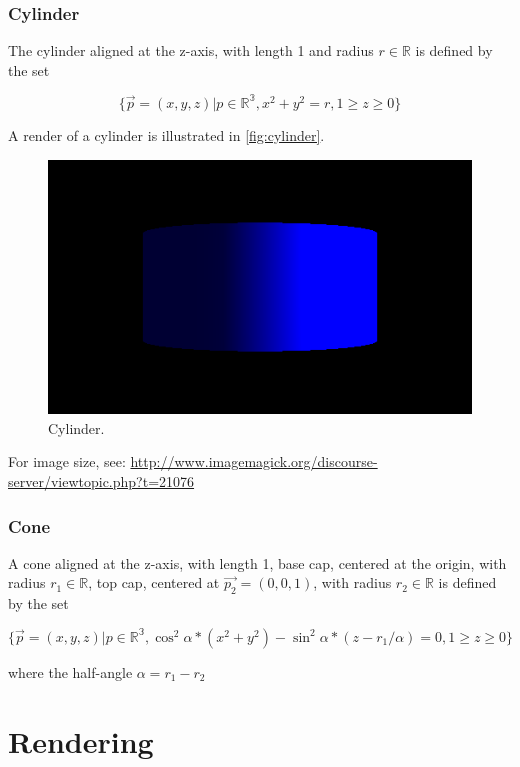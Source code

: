 \subsubsection{Cylinder}\label{cylinder}

The cylinder aligned at the z-axis, with length 1 and radius
$r \in \mathbb{R}$ is defined by the set

\[
  \{\vec{p}=(x,y,z)| p \in \mathbb{R^3}, x^2 + y^2 = r,1 \ge z \ge 0 \}
\]

A render of a cylinder is illustrated in \autoref{fig:cylinder}.

\begin{figure}[htbp]
\centering
\includegraphics{primCylinder.png}
\caption{Cylinder.\label{fig:cylinder}}
\end{figure}

For image size, see:
\url{http://www.imagemagick.org/discourse-server/viewtopic.php?t=21076}

\subsubsection{Cone}\label{cone}

A cone aligned at the z-axis, with length 1, base cap, centered at the
origin, with radius $r_1 \in \mathbb{R}$, top cap, centered at
$\vec{p_2} = (0,0,1)$, with radius $r_2 \in \mathbb{R}$ is defined by
the set

\[
  \{\vec{p}=(x,y,z)| p \in \mathbb{R^3},
  \cos^2 \alpha * (x^2 + y^2) - \sin^2 \alpha * (z - r_1 / \alpha) = 0,
  1 \ge z \ge 0\}
\]

where the half-angle $\alpha = r_1 - r_2$

\section{Rendering}\label{rendering}

